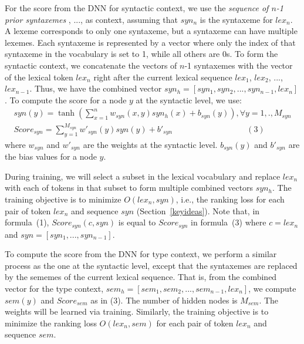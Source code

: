 \vspace{0.03in}
 For the score from the DNN for syntactic
context, we use the {\em sequence of $n$-1 prior syntaxemes}
, ...,  as context, assuming that $syn_n$ is the
syntaxeme for $lex_n$. A lexeme corresponds to only one syntaxeme, but
a syntaxeme can have multiple lexemes.
%
%
Each syntaxeme is represented by a vector where only the index of that
syntaxeme in the vocabulary is set to 1, while all others are 0s.
To form the syntactic context, we concatenate the vectors of $n$-1
syntaxemes with the vector of the lexical token $lex_n$ right
after the current lexical sequence $lex_1$, $lex_2$, ...,
$lex_{n-1}$. Thus, we have the combined vector $syn_h = [syn_1,
  syn_2,..., syn_{n-1}, lex_n]$. To compute the score for a node $y$
at the syntactic level, we use:
\[\begin{array}{l}
{syn}(y) = \tanh \left( {\sum\limits_{x = 1}^{n} {w_{syn}(x,y){syn_h}(x)} + b_{syn}(y) }\right),\forall y = 1,.,{M_{syn}}\\
Score_{syn} = \sum\limits_{y = 1}^{{M_{syn}}} {w'_{syn}(y){syn}(y) + b'_{syn}} \quad \quad \quad \quad \quad \quad \quad \quad \quad (3)
\end{array}\]
where $w_{syn}$ and $w'_{syn}$ are the weights at the syntactic
level. $b_{syn}(y)$ and $b'_{syn}$ are the bias values for a node $y$.


During training, we will select a subset in the lexical vocabulary and
replace $lex_n$ with each of tokens in that subset to form multiple
combined vectors $syn_h$.
The training objective is to minimize $O(lex_n,syn)$, i.e., the
ranking loss for each pair of token $lex_n$ and sequence $syn$
(Section~\ref{keyideas}). Note that, in formula~(1),
$Score_{syn}(c,syn)$ is equal to $Score_{syn}$ in formula~(3) where $c
= lex_n$ and $syn = [syn_1, ..., syn_{n-1}]$.

\vspace{0.03in}
 To compute the score from the DNN for
type context, we perform a similar process as the one at the
syntactic level, except that the syntaxemes are replaced by the
sememes of the current lexical sequence. That is, from the combined
vector for the type context, $sem_h = [sem_1, sem_2,...,
  sem_{n-1}, lex_n]$, we compute $sem(y)$ and $Score_{sem}$ as in
(3). The number of hidden nodes is $M_{sem}$. The weights will be
learned via training.
%
Similarly, the training objective is to minimize the ranking loss
$O(lex_n,sem)$ for each pair of token $lex_n$ and sequence
$sem$.


